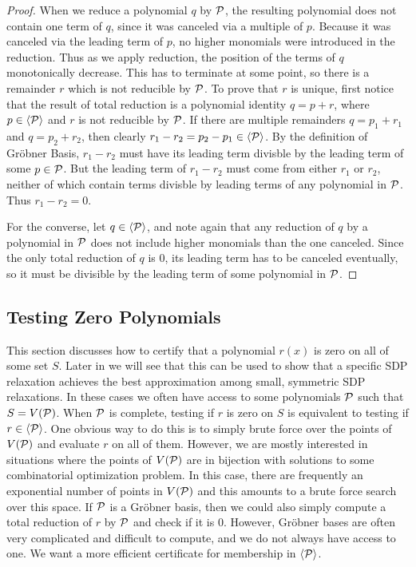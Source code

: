\begin{proof}
When we reduce a polynomial $q$ by $\mathcal P$, the resulting polynomial does not contain one term of $q$, since it was canceled via a multiple of $p$. Because it was canceled via the leading term of $p$, no higher monomials were introduced in the reduction. Thus as we apply reduction, the position of the terms of $q$ monotonically decrease. This has to terminate at some point, so there is a remainder $r$ which is not reducible by $\mathcal P$. To prove that $r$ is unique, first notice that the result of total reduction is a polynomial identity $q = p + r$, where $p \in \langle \mathcal P \rangle$ and $r$ is not reducible by $\mathcal P$. If there are multiple remainders $q = p_1 + r_1$ and $q = p_2 + r_2$, then clearly $r_1 - r_2 = p_2 - p_1 \in \langle \mathcal P \rangle$. By the definition of Gr\"obner Basis, $r_1 - r_2$ must have its leading term divisble by the leading term of some $p \in \mathcal P$. But the leading term of $r_1 - r_2$ must come from either $r_1$ or $r_2$, neither of which contain terms divisble by leading terms of any polynomial in $\mathcal P$. Thus $r_1 - r_2 = 0$.

For the converse, let $q \in \langle \mathcal P \rangle$, and note again that any reduction of $q$ by a polynomial in $\mathcal P$ does not include higher monomials than the one canceled. Since the only total reduction of $q$ is $0$, its leading term has to be canceled eventually, so it must be divisible by the leading term of some polynomial in $\mathcal P$.
\end{proof}

\subsection{Testing Zero Polynomials}

This section discusses how to certify that a polynomial $r(x)$ is zero on all of some set $S$. Later in  we will see that this can be used to show that a specific SDP relaxation achieves the best approximation among small, symmetric SDP relaxations.
In these cases we often have access to some polynomials $\mathcal P$ such that $S = V(\mathcal P)$.
When $\mathcal P$ is complete, testing if $r$ is zero on $S$ is equivalent to testing if $r \in \langle \mathcal P \rangle$.
One obvious way to do this is to simply brute force over the points of $V(\mathcal P)$ and evaluate $r$ on all of them.
However, we are mostly interested in situations where the points of $V(\mathcal P)$ are in bijection with solutions to some combinatorial optimization problem.
In this case, there are frequently an exponential number of points in $V(\mathcal P)$ and this amounts to a brute force search over this space.
If $\mathcal P$ is a Gr\"obner basis, then we could also simply compute a total reduction of $r$ by $\mathcal P$ and check if it is $0$.
However, Gr\"obner bases are often very complicated and difficult to compute, and we do not always have access to one.
We want a more efficient certificate for membership in $\langle \mathcal P \rangle$.

